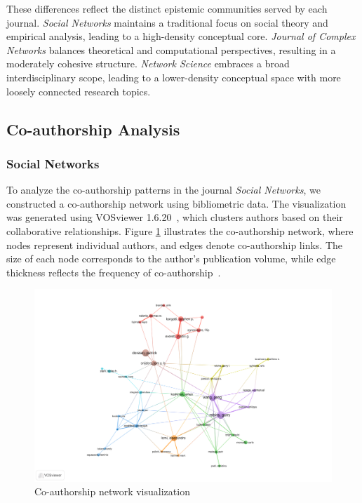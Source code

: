\documentclass[twocolumn]{article}
\begin{document}
		These differences reflect the distinct epistemic communities served by each journal. \textit{Social Networks} maintains a traditional focus on social theory and empirical analysis, leading to a high-density conceptual core. \textit{Journal of Complex Networks} balances theoretical and computational perspectives, resulting in a moderately cohesive structure. \textit{Network Science} embraces a broad interdisciplinary scope, leading to a lower-density conceptual space with more loosely connected research topics.
		
		\subsection{Co-authorship Analysis}
		
		\subsubsection*{Social Networks}
		
		To analyze the co-authorship patterns in the journal \textit{Social Networks}, we constructed a co-authorship network using bibliometric data. The visualization was generated using VOSviewer 1.6.20~\cite{van2010software}, which clusters authors based on their collaborative relationships. Figure \ref{fig.fig13} illustrates the co-authorship network, where nodes represent individual authors, and edges denote co-authorship links. The size of each node corresponds to the author's publication volume, while edge thickness reflects the frequency of co-authorship~\cite{glanzel2004handbook, newman2004coauthorship}.
		
		
		\begin{figure}[htbp]
			\centering
			\includegraphics[width=\columnwidth]{Social Networks/WOS data/VOS/co-authorship.pdf}
			\caption{Co-authorship network visualization}
			\label{fig.fig13}
		\end{figure}
		
\end{document}
